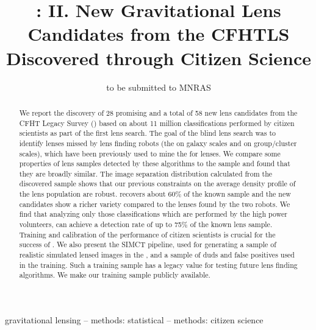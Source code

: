\documentclass[useAMS,usenatbib,a4paper]{mn2e}
\title[New Gravitational Lens Candidates from CFHTLS]
{\SW: II. New Gravitational Lens Candidates from the CFHTLS Discovered
through Citizen Science}
\author[More et al.]{%
 
}
\begin{document}
\date{to be submitted to MNRAS}
\pagerange{\pageref{firstpage}--\pageref{lastpage}}

\maketitle

\label{firstpage}


\begin{abstract}

We report the discovery of 28 promising and a total of 58 new lens
candidates from the CFHT Legacy Survey (\cfhtls) based on about 11
million classifications performed by citizen scientists as part of the
first \sw lens search.  The goal of the blind lens search was to
identify lenses missed by lens finding robots (the \rf on galaxy scales
and \af on group/cluster scales), which have been previously used to
mine the \cfhtls for lenses.  We compare some properties of lens samples
detected by these algorithms to the \sw sample and found that they are
broadly similar.  The image separation distribution calculated from the
\sw discovered sample shows that our previous constraints on the average
density profile of the lens population are robust. \sw recovers about
60\% of the known sample and the new candidates show a richer variety
compared to the lenses found by the two robots. We find that analyzing
only those classifications which are performed by the high power
volunteers, \sw can achieve a detection rate of up to 75\% of the known
lens sample.  Training and calibration of the performance of citizen
scientists is crucial for the success of \sw. We also present the SIMCT
pipeline, used for generating a sample of realistic simulated lensed
images in the \cfhtls, and a sample of duds and false positives used in
the training.  Such a training sample has a legacy value for testing
future lens finding algorithms. We make our training sample publicly
available.

\end{abstract}


\begin{keywords}
  gravitational lensing   --
  methods: statistical    --
  methods: citizen science
\end{keywords}
\end{document}
